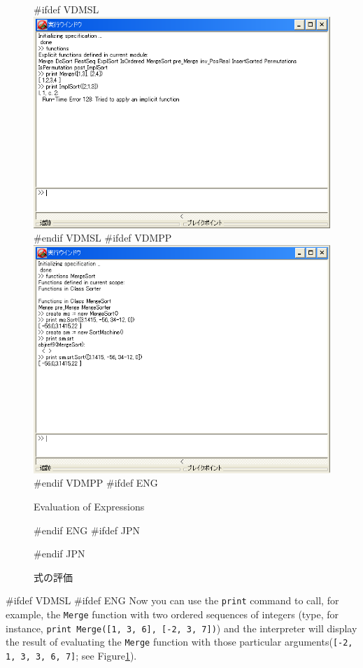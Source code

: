 \documentclass[\pformat,12pt]{article}
\newcommand{\aaa}{\tt }
\begin{document}
\begin{figure}[tbh]
\begin{center}
\mbox{}
#ifdef VDMSL
\includegraphics[width=15cm]{evalExpr-sl.png}
#endif VDMSL
#ifdef VDMPP
\includegraphics[width=15cm]{evalExpr-pp.png}
#endif VDMPP
#ifdef ENG
\caption{Evaluation of Expressions}
#endif ENG
#ifdef JPN
\caption{式の評価}
#endif JPN
\label{fig:evalgui}
\end{center}
\end{figure}

#ifdef VDMSL 
#ifdef ENG
Now you can use the {\tt print} command to call, for example, the
{\aaa Merge} function with two ordered sequences of integers (type,
for instance, {\tt print Merge([1, 3, 6], [-2, 3, 7])}) and the
interpreter will display the result of evaluating the {\aaa Merge}
function with those particular arguments({\tt [-2, 1, 3, 3, 6, 7]};
see Figure\ref{fig:evalgui}).
\end{document}
